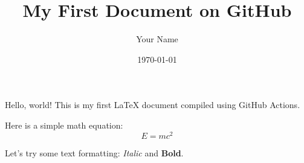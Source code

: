 \documentclass{article}
\title{My First Document on GitHub}
\author{Your Name}
\date{\today}
\begin{document}
\maketitle

Hello, world! This is my first LaTeX document compiled using GitHub Actions.

Here is a simple math equation:
\[ E = mc^2 \]

Let's try some text formatting: \textit{Italic} and \textbf{Bold}.
\end{document}
